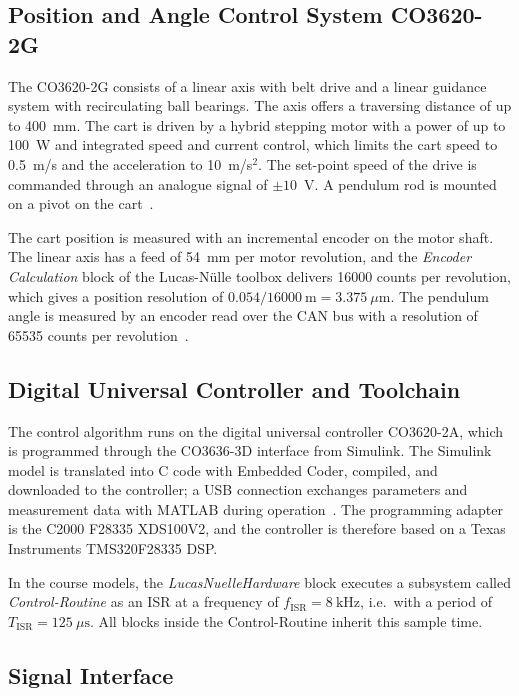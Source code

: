 \subsection{Position and Angle Control System CO3620-2G}
\label{subsec:co3620-2g}

The CO3620-2G consists of a linear axis with belt drive and a linear guidance
system with recirculating ball bearings. The axis offers a traversing distance
of up to 400~mm. The cart is driven by a hybrid stepping motor with a power of
up to 100~W and integrated speed and current control, which limits the cart
speed to 0.5~m/s and the acceleration to 10~m/s$^2$. The set-point speed of the
drive is commanded through an analogue signal of $\pm 10$~V. A pendulum rod is
mounted on a pivot on the cart~\cite{ln_manual}.

The cart position is measured with an incremental encoder on the motor shaft.
The linear axis has a feed of 54~mm per motor revolution, and the
\emph{Encoder Calculation} block of the Lucas-Nülle toolbox delivers 16000
counts per revolution, which gives a position resolution of
$0.054/16000~\mathrm{m} = 3.375~\mu\mathrm{m}$. The pendulum angle is measured
by an encoder read over the \acf{CAN} bus with a
resolution of 65535 counts per revolution~\cite{ln_manual}.

\subsection{Digital Universal Controller and Toolchain}
\label{subsec:co3620-2a}

The control algorithm runs on the digital universal controller CO3620-2A,
which is programmed through the CO3636-3D interface from Simulink. The
Simulink model is translated into C code with Embedded Coder, compiled, and
downloaded to the controller; a USB connection exchanges parameters and
measurement data with MATLAB during operation~\cite{ln_manual}. The programming
adapter is the C2000 F28335 XDS100V2, and the controller is therefore based on
a Texas Instruments TMS320F28335 \acf{DSP}.

In the course models, the \emph{LucasNuelleHardware} block executes a
subsystem called \emph{Control-Routine} as an \acf{ISR} at a frequency of $f_{\mathrm{ISR}} = 8~\mathrm{kHz}$, i.e.\ with a
period of $T_{\mathrm{ISR}} = 125~\mu\mathrm{s}$. All blocks inside the
Control-Routine inherit this sample time.

\subsection{Signal Interface}
\label{subsec:signals}

